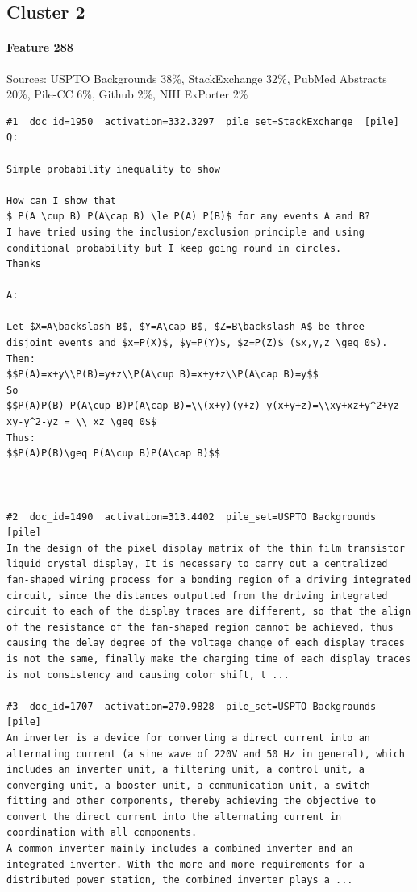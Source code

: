 \subsection*{Cluster 2}

\paragraph*{Feature 288} Sources: USPTO Backgrounds 38\%, StackExchange 32\%, PubMed Abstracts 20\%, Pile-CC 6\%, Github 2\%, NIH ExPorter 2\%

\begin{verbatim}
#1  doc_id=1950  activation=332.3297  pile_set=StackExchange  [pile]
Q:

Simple probability inequality to show

How can I show that 
$ P(A \cup B) P(A\cap B) \le P(A) P(B)$ for any events A and B?
I have tried using the inclusion/exclusion principle and using conditional probability but I keep going round in circles.
Thanks

A:

Let $X=A\backslash B$, $Y=A\cap B$, $Z=B\backslash A$ be three disjoint events and $x=P(X)$, $y=P(Y)$, $z=P(Z)$ ($x,y,z \geq 0$). 
Then:
$$P(A)=x+y\\P(B)=y+z\\P(A\cup B)=x+y+z\\P(A\cap B)=y$$
So
$$P(A)P(B)-P(A\cup B)P(A\cap B)=\\(x+y)(y+z)-y(x+y+z)=\\xy+xz+y^2+yz-xy-y^2-yz = \\ xz \geq 0$$
Thus:
$$P(A)P(B)\geq P(A\cup B)P(A\cap B)$$



#2  doc_id=1490  activation=313.4402  pile_set=USPTO Backgrounds  [pile]
In the design of the pixel display matrix of the thin film transistor liquid crystal display, It is necessary to carry out a centralized fan-shaped wiring process for a bonding region of a driving integrated circuit, since the distances outputted from the driving integrated circuit to each of the display traces are different, so that the align of the resistance of the fan-shaped region cannot be achieved, thus causing the delay degree of the voltage change of each display traces is not the same, finally make the charging time of each display traces is not consistency and causing color shift, t ...

#3  doc_id=1707  activation=270.9828  pile_set=USPTO Backgrounds  [pile]
An inverter is a device for converting a direct current into an alternating current (a sine wave of 220V and 50 Hz in general), which includes an inverter unit, a filtering unit, a control unit, a converging unit, a booster unit, a communication unit, a switch fitting and other components, thereby achieving the objective to convert the direct current into the alternating current in coordination with all components.
A common inverter mainly includes a combined inverter and an integrated inverter. With the more and more requirements for a distributed power station, the combined inverter plays a ...


\end{verbatim}
